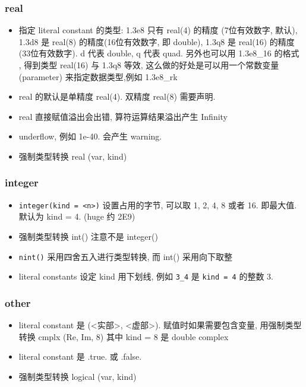 \subsubsection{real}
\begin{itemize}
\item 指定 literal constant 的类型: 1.3e8 只有 real(4) 的精度 (7位有效数字, 默认), 1.3d8 是 real(8) 的精度(16位有效数字, 即 double), 1.3q8 是 real(16) 的精度(33位有效数字). d 代表 double, q 代表 quad. 另外也可以用 1.3e8_16 的格式 , 得到类型  real(16) 与 1.3q8 等效, 这么做的好处是可以用一个常数变量 (parameter) 来指定数据类型,例如 1.3e8_rk 
\item real 的默认是单精度 real(4). 双精度 real(8) 需要声明.
\item real 直接赋值溢出会出错, 算符运算结果溢出产生 Infinity
\item underflow, 例如 1e-40. 会产生 warning.
\item 强制类型转换 real (var, kind)
\end{itemize}

\subsubsection{integer}
\begin{itemize}
\item \verb`integer(kind = <n>)` 设置占用的字节, 可以取 1, 2, 4, 8 或者 16. 即最大值. 默认为 
   kind = 4. (huge 约 2E9)
\item 强制类型转换 int() 注意不是 integer()
\item \verb`nint()` 采用四舍五入进行类型转换, 而 int() 采用向下取整
\item literal constants 设定 kind 用下划线, 例如 \verb`3_4` 是 \verb`kind = 4` 的整数 3.
\end{itemize}

\subsubsection{other}
\begin{itemize}
\item literal constant 是 (<实部>, <虚部>). 赋值时如果需要包含变量, 用强制类型转换 cmplx (Re, Im, 8) 其中 kind = 8 是 double complex
\item literal constant 是 .true. 或 .false.
\item 强制类型转换 logical (var, kind)
\end{itemize}

